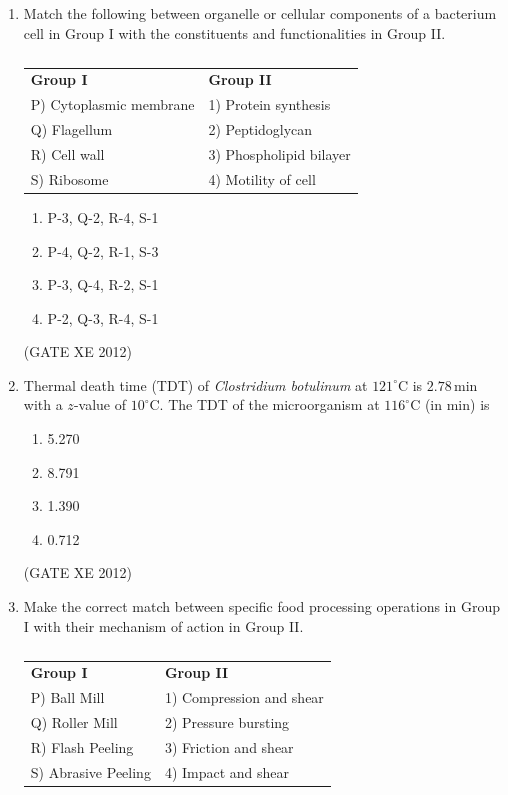 \documentclass[12pt]{article}
\begin{document}
\begin{enumerate}
\item Match the following between organelle or cellular components of a bacterium cell in Group I with the constituents and functionalities in Group II.  

\begin{table}[H]
\centering
\caption{} \label{}
\begin{tabular}{l l}
\textbf{Group I} & \textbf{Group II} \\
P) Cytoplasmic membrane & 1) Protein synthesis \\
Q) Flagellum & 2) Peptidoglycan \\
R) Cell wall & 3) Phospholipid bilayer \\
S) Ribosome & 4) Motility of cell \\
\end{tabular}
\end{table}

\begin{multicols}{4}
\begin{enumerate}
\item P-3, Q-2, R-4, S-1  
\item P-4, Q-2, R-1, S-3  
\item P-3, Q-4, R-2, S-1  
\item P-2, Q-3, R-4, S-1  
\end{enumerate}
\end{multicols}
(GATE XE 2012)

\item Thermal death time (TDT) of \textit{Clostridium botulinum} at $121^{\circ}$C is $2.78 \, \text{min}$ with a $z$-value of $10^{\circ}$C.  
The TDT of the microorganism at $116^{\circ}$C (in min) is  

\begin{multicols}{4}
\begin{enumerate}
\item 5.270  
\item 8.791  
\item 1.390  
\item 0.712  
\end{enumerate}
\end{multicols}
(GATE XE 2012)

\item Make the correct match between specific food processing operations in Group I with their mechanism of action in Group II.  

\begin{table}[H]
\centering
\caption{} \label{}
\begin{tabular}{l l}
\textbf{Group I} & \textbf{Group II} \\
P) Ball Mill & 1) Compression and shear \\
Q) Roller Mill & 2) Pressure bursting \\
R) Flash Peeling & 3) Friction and shear \\
S) Abrasive Peeling & 4) Impact and shear \\
\end{tabular}
\end{table}


\end{enumerate}
\end{document}
